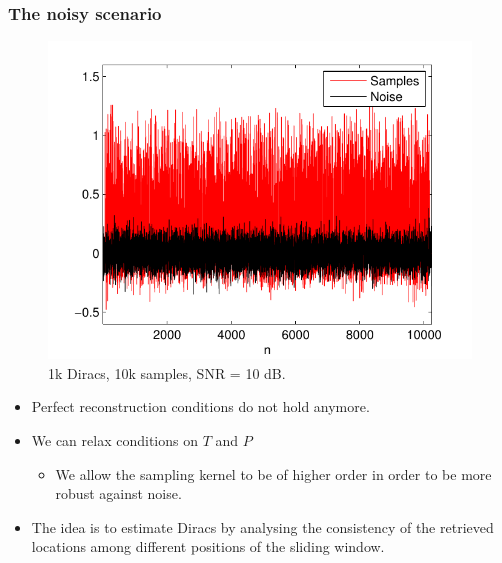 \documentclass[8pt]{beamer}
\begin{document}
\begin{frame}
\frametitle{The noisy scenario}

\begin{figure}[h]
\includegraphics[width=.4\linewidth]{figures/noisy_samples}
\caption{1k Diracs, 10k samples, SNR = 10 dB.}
\end{figure}

\begin{itemize}
\item Perfect reconstruction conditions do not hold anymore.

\item We can relax conditions on $T$ and $P$ 
\begin{itemize}
\item We allow the sampling kernel to be of higher order in order to be more robust against noise.
\end{itemize}

\item The idea is to estimate Diracs by analysing the consistency of the retrieved 
locations among different positions of the sliding window.

\end{itemize}

\end{frame}
\end{document}
